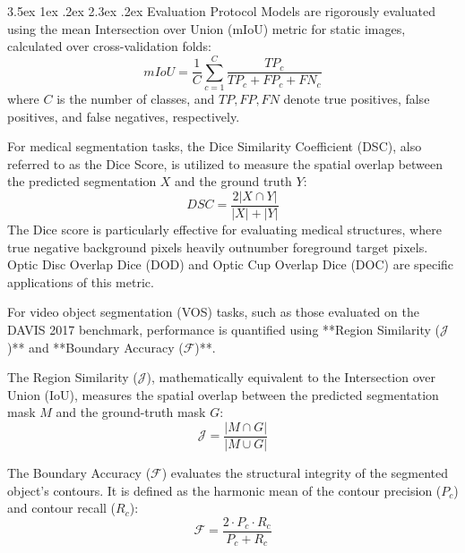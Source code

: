 \documentclass[journal,12pt,onecolumn,draftclsnofoot]{IEEEtran}
\makeatletter
\renewcommand{\section}{\@startsection{section}{1}{\z@}%
    {3.5ex \@plus 1ex \@minus .2ex}%
    {2.3ex \@plus.2ex}%
    {\normalfont\Large\bfseries}}
\makeatother
\begin{document}
\section{Evaluation Protocol}
Models are rigorously evaluated using the mean Intersection over Union (mIoU) metric for static images, calculated over cross-validation folds:
\begin{equation}
    mIoU = \frac{1}{C} \sum_{c=1}^C \frac{TP_c}{TP_c + FP_c + FN_c}
\end{equation}
where $C$ is the number of classes, and $TP, FP, FN$ denote true positives, false positives, and false negatives, respectively. 

For medical segmentation tasks, the Dice Similarity Coefficient (DSC), also referred to as the Dice Score, is utilized to measure the spatial overlap between the predicted segmentation $X$ and the ground truth $Y$:
\begin{equation}
    DSC = \frac{2 |X \cap Y|}{|X| + |Y|}
\end{equation}
The Dice score is particularly effective for evaluating medical structures, where true negative background pixels heavily outnumber foreground target pixels. Optic Disc Overlap Dice (DOD) and Optic Cup Overlap Dice (DOC) are specific applications of this metric.

For video object segmentation (VOS) tasks, such as those evaluated on the DAVIS 2017 benchmark, performance is quantified using **Region Similarity ($\mathcal{J}$)** and **Boundary Accuracy ($\mathcal{F}$)**.

The Region Similarity ($\mathcal{J}$), mathematically equivalent to the Intersection over Union (IoU), measures the spatial overlap between the predicted segmentation mask $M$ and the ground-truth mask $G$:
\begin{equation}
    \mathcal{J} = \frac{|M \cap G|}{|M \cup G|}
\end{equation}

The Boundary Accuracy ($\mathcal{F}$) evaluates the structural integrity of the segmented object's contours. It is defined as the harmonic mean of the contour precision ($P_c$) and contour recall ($R_c$):
\begin{equation}
    \mathcal{F} = \frac{2 \cdot P_c \cdot R_c}{P_c + R_c}
\end{equation}
\end{document}

